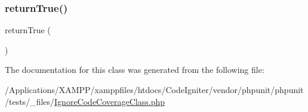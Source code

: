 \subsubsection{\texorpdfstring{return\+True()}{returnTrue()}}
{\footnotesize\ttfamily return\+True (\begin{DoxyParamCaption}{ }\end{DoxyParamCaption})}



The documentation for this class was generated from the following file\+:\begin{DoxyCompactItemize}
\item 
/\+Applications/\+X\+A\+M\+P\+P/xamppfiles/htdocs/\+Code\+Igniter/vendor/phpunit/phpunit/tests/\+\_\+files/\mbox{\hyperlink{_ignore_code_coverage_class_8php}{Ignore\+Code\+Coverage\+Class.\+php}}\end{DoxyCompactItemize}

